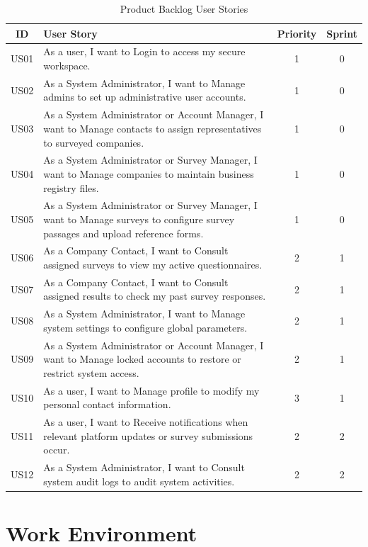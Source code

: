 \documentclass[12pt,a4paper]{report}
\begin{document}
\begin{table}[H]
\centering
\caption{Product Backlog User Stories}
\vspace{0.2cm}
\renewcommand{\arraystretch}{1.15}
\begin{tabular}{|c|p{9.5cm}|c|c|}
\hline
\textbf{ID} & \textbf{User Story} & \textbf{Priority} & \textbf{Sprint} \\ \hline
US01 & As a user, I want to Login to access my secure workspace. & 1 & 0 \\ \hline
US02 & As a System Administrator, I want to Manage admins to set up administrative user accounts. & 1 & 0 \\ \hline
US03 & As a System Administrator or Account Manager, I want to Manage contacts to assign representatives to surveyed companies. & 1 & 0 \\ \hline
US04 & As a System Administrator or Survey Manager, I want to Manage companies to maintain business registry files. & 1 & 0 \\ \hline
US05 & As a System Administrator or Survey Manager, I want to Manage surveys to configure survey passages and upload reference forms. & 1 & 0 \\ \hline
US06 & As a Company Contact, I want to Consult assigned surveys to view my active questionnaires. & 2 & 1 \\ \hline
US07  & As a Company Contact, I want to Consult assigned results to check my past survey responses. & 2 & 1 \\ \hline
US08 & As a System Administrator, I want to Manage system settings to configure global parameters. & 2 & 1 \\ \hline
US09  & As a System Administrator or Account Manager, I want to Manage locked accounts to restore or restrict system access. & 2 & 1 \\ \hline
US10 & As a user, I want to Manage profile to modify my personal contact information. & 3 & 1 \\ \hline
US11 & As a user, I want to Receive notifications when relevant platform updates or survey submissions occur. & 2 & 2 \\ \hline
US12 & As a System Administrator, I want to Consult system audit logs to audit system activities. & 2 & 2 \\ \hline
\end{tabular}
\end{table}

\section{Work Environment}
\end{document}
